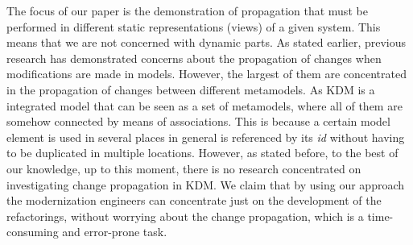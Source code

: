 
The focus of our paper is the demonstration of propagation that must be performed in different static representations (views) of a given system. This means that we are not concerned with dynamic parts.
As stated earlier, previous research has demonstrated concerns about the propagation of changes when modifications are made in models. However, the largest of them are concentrated in the propagation of changes between different metamodels. As KDM is a integrated model that can be seen as a set of metamodels, where all of them are somehow connected by means of associations. This is because a certain model element is used in several places in general is referenced by its \textit{id} without having to be duplicated in multiple locations. However, as stated before, to the best of our knowledge, up to this moment, there is no research concentrated on investigating change propagation in KDM. We claim that by using our approach the modernization engineers can concentrate just on the development of the refactorings, without worrying about the change propagation, which is a time-consuming and error-prone task.


